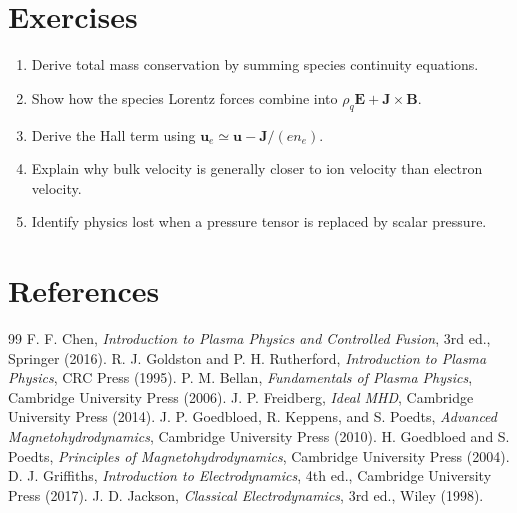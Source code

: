 \documentclass[11pt]{article}
\begin{document}
\section{Exercises}
\begin{enumerate}[leftmargin=1.8em]
\item Derive total mass conservation by summing species continuity equations.
\item Show how the species Lorentz forces combine into $\rho_q\mathbf E+\mathbf J\times\mathbf B$.
\item Derive the Hall term using $\mathbf u_e\simeq\mathbf u-\mathbf J/(en_e)$.
\item Explain why bulk velocity is generally closer to ion velocity than electron velocity.
\item Identify physics lost when a pressure tensor is replaced by scalar pressure.
\end{enumerate}

\section{References}
\begin{thebibliography}{99}
 F. F. Chen, \emph{Introduction to Plasma Physics and Controlled Fusion}, 3rd ed., Springer (2016).
 R. J. Goldston and P. H. Rutherford, \emph{Introduction to Plasma Physics}, CRC Press (1995).
 P. M. Bellan, \emph{Fundamentals of Plasma Physics}, Cambridge University Press (2006).
 J. P. Freidberg, \emph{Ideal MHD}, Cambridge University Press (2014).
 J. P. Goedbloed, R. Keppens, and S. Poedts, \emph{Advanced Magnetohydrodynamics}, Cambridge University Press (2010).
 H. Goedbloed and S. Poedts, \emph{Principles of Magnetohydrodynamics}, Cambridge University Press (2004).
 D. J. Griffiths, \emph{Introduction to Electrodynamics}, 4th ed., Cambridge University Press (2017).
 J. D. Jackson, \emph{Classical Electrodynamics}, 3rd ed., Wiley (1998).
\end{thebibliography}
\end{document}
